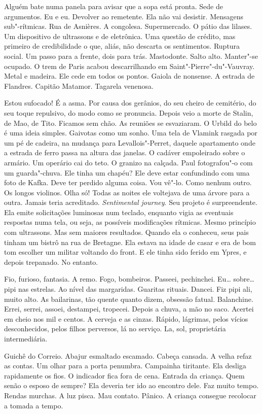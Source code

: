 Alguém bate numa panela para avisar que a sopa está pronta. Sede de
argumentos. Eu e eu. Devolver ao remetente. Ela não vai desistir.
Mensagens sub"-rítmicas. Rua de Asnières. A congolesa. Supermercado. O
pátio das lilases. Um dispositivo de ultrassons e de eletrônica. Uma
questão de crédito, mas primeiro de credibilidade o que, aliás, não
descarta os sentimentos. Ruptura social. Um passo para a frente, dois
para trás. Mastodonte. Salto alto. Manter"-se ocupado. O trem de Paris
acabou descarrilhando em Saint"-Pierre"-du"-Vauvray. Metal e madeira. Ele
cede em todos os pontos. Gaiola de nonsense. A estrada de Flandres.
Capitão Matamor. Tagarela venenosa.

Estou sufocado! É a asma. Por causa dos gerânios, do seu cheiro de
cemitério, do seu toque repulsivo, do modo como se pronuncia. Depois
veio a morte de Stalin, de Mao, de Tito. Ficamos sem chão. As reuniões
se esvaziaram. O Urbild do belo é uma ideia simples. Gaivotas como um
sonho. Uma tela de Vlamink rasgada por um pé de cadeira, na mudança para
Levallois"-Perret, daquele apartamento onde a estrada de ferro passa na
altura das janelas. O cadáver empoleirado sobre o armário. Um operário
cai do teto. O granizo na calçada. Paul fotografou"-o com um
guarda"-chuva. Ele tinha um chapéu? Ele deve estar confundindo com uma
foto de Kafka. Deve ter perdido alguma coisa. Vou vê"-lo. Como nenhum
outro. Os longos violinos. Olha só! Todas as noites ele voltejava de uma
árvore para a outra. Jamais teria acreditado. \emph{Sentimental
journey}. Seu projeto é surpreendente. Ela emite solicitações luminosas
num teclado, enquanto vigia as eventuais respostas numa tela, ou seja,
as possíveis modificações rítmicas. Mesmo princípio com ultrassons. Mas
sem maiores resultados. Quando ela o conheceu, seus pais tinham um
bistrô na rua de Bretagne. Ela estava na idade de casar e era de bom tom
escolher um militar voltando do front. E ele tinha sido ferido em Ypres,
e depois trepanado. No entanto.

Fio, furioso, fantasia. A remo. Fogo, bombeiros. Passeei, pechinchei.
Eu\ldots{} sobre\ldots{} pipi nas estrelas. Ao nível das margaridas. Guaritas
rituais. Dancei. Fiz pipi ali, muito alto. As bailarinas, tão quente
quanto dizem, obsessão fatual. Balanchine. Errei, serrei, assoei,
destampei, tropecei. Depois a chuva, a mão no saco. Acertei em cheio nos
mil e centos. A cerveja e as cinzas. Rápido, lágrimas, pelos vícios
desconhecidos, pelos filhos perversos, lá no serviço. La, sol,
proprietária intermediária.

Guichê do Correio. Abajur esmaltado escamado. Cabeça cansada. A velha
refaz as contas. Um olhar para a porta penumbra. Campainha tiritante.
Ela desliga rapidamente os fios. O indicador fica fora de cena. Entrada
da criança. Quem senão o esposo de sempre? Ela deveria ter ido ao
encontro dele. Faz muito tempo. Rendas murchas. A luz pisca. Mau
contato. Pânico. A criança consegue recolocar a tomada a tempo.

